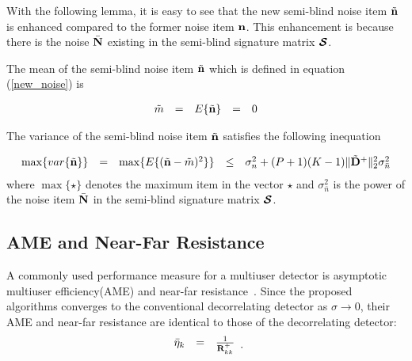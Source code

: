 \documentclass[a4paper,10pt,fleqn, twocolumn]{IEEETran}
\newcommand{\bn}{{\bf n}}
\newcommand{\bN}{{\bf N}}
\newcommand{\bD}{{\bf D}}
\newcommand{\bR}{{\bf R}}
\newcommand{\bcS}{{\mbox {\boldmath ${\cal S}$}}}
\begin{document}
With the following lemma, it is easy to see that the new
semi-blind noise item $\tilde{\bn}$ is enhanced compared to the
former noise item $\bn$. This enhancement is because there is the
noise $\bar{\bN}$ existing in the semi-blind signature matrix
$\bcS$.

The mean of the semi-blind noise item $\tilde{\bn}$ which is
defined in equation (\ref{new_noise}) is

\begin{equation}
\begin{array}{rcccl}
\tilde{m}&=&E\{\tilde{\bn}\}&=&0
\end{array}
\end{equation}

The variance of the semi-blind noise item $\tilde{\bn}$ satisfies
the following inequation

\begin{equation}
\begin{array}{rcccl}
\max\{var\{\tilde{\bn}\}\}&=&\max\{E\{(\tilde{\bn}-\tilde{m})^2\}\}&\leq&\sigma_n^2+(P+1)(K-1)\|\tilde{\bD}^+\|_2^2\sigma_{\bar{n}}^2
\end{array} \label{noise_mean}
\end{equation}
\noindent where $\max\{\star\}$ denotes the maximum item in the
vector $\star$ and $\sigma_{\bar{n}}^2$ is the power of the noise
item $\bar{\bN}$ in the semi-blind signature matrix $\bcS$.

\subsection{AME and Near-Far Resistance}
A commonly used performance measure for a multiuser detector is
asymptotic multiuser efficiency(AME) and near-far
resistance~\cite{Verd98}. Since the proposed algorithms converges
to the conventional decorrelating detector as $\sigma\rightarrow
0$, their AME and near-far resistance are identical to those of
the decorrelating detector:
\begin{equation}
\begin{array}{rcl}
\bar{\eta}_k&=&\frac{1}{\bR_{kk}^{+}}
\end{array}.
\end{equation}
\end{document}
